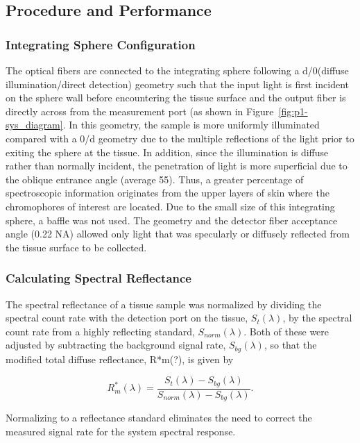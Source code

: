 \subsection{Procedure and Performance}

\subsubsection{Integrating Sphere Configuration}
The optical fibers are connected to the integrating sphere following a d/0\degree (diffuse illumination/direct detection) geometry such that the input light is first incident on the sphere wall before encountering the tissue surface and the output fiber is directly across from the measurement port (as shown in Figure~\ref{fig:p1-sys_diagram}. In this geometry, the sample is more uniformly illuminated compared with a 0\degree/d geometry due to the multiple reflections of the light prior to exiting the sphere at the tissue. In addition, since the illumination is diffuse rather than normally incident, the penetration of light is more superficial due to the oblique entrance angle (average 55\degree). Thus, a greater percentage of spectroscopic information originates from the upper layers of skin where the chromophores of interest are located. Due to the small size of this integrating sphere, a baffle was not used. The geometry and the detector fiber acceptance angle (0.22 NA) allowed only light that was specularly or diffusely reflected from the tissue surface to be collected.

\subsubsection{Calculating Spectral Reflectance}
The spectral reflectance of a tissue sample was normalized by dividing the spectral count rate with the detection port on the tissue, $S_t(\lambda)$, by the spectral count rate from a highly reflecting standard, $S_{norm}(\lambda)$. Both of these were adjusted by subtracting the background signal rate, $S_{bg}(\lambda)$, so that the modified total diffuse reflectance, R*m(?), is given by

\begin{equation}
	R_m^\ast(\lambda)=\frac{S_t(\lambda)-S_{bg}(\lambda)}{S_{norm}(\lambda)-S_{bg}(\lambda)}.
\end{equation}

Normalizing to a reflectance standard eliminates the need to correct the measured signal rate for the system spectral response.

